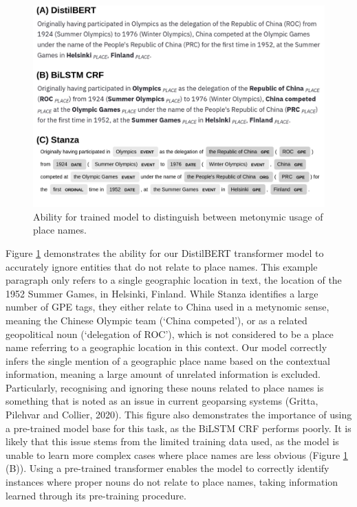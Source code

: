 \documentclass[
  letterpaper,
  11pt,
  english,
  onehalfspacing,
  headsepline]{MastersDoctoralThesis}
\begin{document}
\begin{figure}

{\centering \includegraphics{03_transformer/./03_figures/figure3.jpg}

}

\caption{\label{fig-qual-china}Ability for trained model to distinguish
between metonymic usage of place names.}

\end{figure}

Figure \ref{fig-qual-china} demonstrates the ability for our DistilBERT
transformer model to accurately ignore entities that do not relate to
place names. This example paragraph only refers to a single geographic
location in text, the location of the 1952 Summer Games, in Helsinki,
Finland. While Stanza identifies a large number of GPE tags, they either
relate to China used in a metynomic sense, meaning the Chinese Olympic
team (`China competed'), or as a related geopolitical noun (`delegation
of ROC'), which is not considered to be a place name referring to a
geographic location in this context. Our model correctly infers the
single mention of a geographic place name based on the contextual
information, meaning a large amount of unrelated information is
excluded. Particularly, recognising and ignoring these nouns related to
place names is something that is noted as an issue in current geoparsing
systems (Gritta, Pilehvar and Collier, 2020). This figure also
demonstrates the importance of using a pre-trained model base for this
task, as the BiLSTM CRF performs poorly. It is likely that this issue
stems from the limited training data used, as the model is unable to
learn more complex cases where place names are less obvious (Figure
\ref{fig-qual-china} (B)). Using a pre-trained transformer enables the
model to correctly identify instances where proper nouns do not relate
to place names, taking information learned through its pre-training
procedure.
\end{document}
